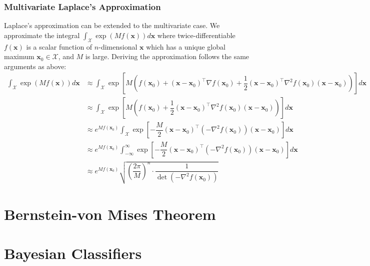 \documentclass[11pt]{report} %
\begin{document}
\subsubsection{Multivariate Laplace's Approximation}

Laplace's approximation can be extended to the multivariate case. We approximate the integral $\int_{\mathcal{X}}\exp\left(Mf\left(\mathbf{x}\right)\right)d\mathbf{x}$ where twice-differentiable $f\left(\mathbf{x}\right)$ is a scalar function of $n$-dimensional $\mathbf{x}$ which has a unique global maximum $\mathbf{x}_{0} \in \mathcal{X}$, and $M$ is large. Deriving the approximation follows the same arguments as above:
\begin{align}
\int_{\mathcal{X}}\exp\left(Mf\left(\mathbf{x}\right)\right)d\mathbf{x} &\approx \int_{\mathcal{X}}\exp\left[M\left(f\left(\mathbf{x}_{0}\right) + \left(\mathbf{x} - \mathbf{x}_{0}\right)^{\top}\nabla f\left(\mathbf{x}_{0}\right) + \dfrac{1}{2}\left(\mathbf{x} - \mathbf{x}_{0}\right)^{\top}\nabla^{2}f\left(\mathbf{x}_{0}\right)\left(\mathbf{x} - \mathbf{x}_{0}\right)\right)\right]d\mathbf{x} \\
&\approx \int_{\mathcal{X}}\exp\left[M\left(f\left(\mathbf{x}_{0}\right) + \dfrac{1}{2}\left(\mathbf{x} - \mathbf{x}_{0}\right)^{\top}\nabla^{2}f\left(\mathbf{x}_{0}\right)\left(\mathbf{x} - \mathbf{x}_{0}\right)\right)\right]d\mathbf{x} \\
&\approx e^{Mf\left(\mathbf{x}_{0}\right)}\int_{\mathcal{X}}\exp\left[-\dfrac{M}{2}\left(\mathbf{x} - \mathbf{x}_{0}\right)^{\top}\left(-\nabla^{2}f\left(\mathbf{x}_{0}\right)\right)\left(\mathbf{x} - \mathbf{x}_{0}\right)\right]d\mathbf{x} \\
&\approx e^{Mf\left(\mathbf{x}_{0}\right)}\int_{-\infty}^{\infty}\exp\left[-\dfrac{M}{2}\left(\mathbf{x} - \mathbf{x}_{0}\right)^{\top}\left(-\nabla^{2}f\left(\mathbf{x}_{0}\right)\right)\left(\mathbf{x} - \mathbf{x}_{0}\right)\right]d\mathbf{x} \\
&\approx e^{Mf\left(\mathbf{x}_{0}\right)}\sqrt{\left(\dfrac{2\pi}{M}\right)^{n}\cdot\dfrac{1}{\det\left(-\nabla^{2}f\left(\mathbf{x}_{0}\right)\right)}}
\end{align}

\section{Bernstein-von Mises Theorem}

\section{Bayesian Classifiers}
\end{document}
